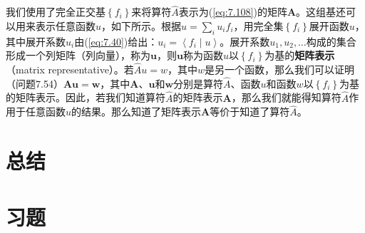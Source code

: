    我们使用了完全正交基$\left\{f_i\right\}$来将算符$\hat{A}$表示为(\ref{eq:7.108})的矩阵$\mathbf{A}$。这组基还可以用来表示任意函数$u$，如下所示。根据$u = \sum_{i}u_{i}f_i$，用完全集$\left\{f_i\right\}$展开函数$u$，其中展开系数$u_i$由(\ref{eq:7.40})给出：$u_i = \left\langle f_i \middle| u \right\rangle$。展开系数$u_1,u_2,\ldots$构成的集合形成一个列矩阵（列向量），称为$\mathbf{u}$，则$\mathbf{u}$称为函数$u$以$\left\{f_i\right\}$为基的\textbf{矩阵表示}（matrix representative）。若$\hat{A}u =w$，其中$w$是另一个函数，那么我们可以证明（问题7.54）$\mathbf{Au} = \mathbf{w}$，其中$\mathbf{A}$、$\mathbf{u}$和$\mathbf{w}$分别是算符$\hat{A}$、函数$u$和函数$w$以$\left\{f_i\right\}$为基的矩阵表示。因此，若我们知道算符$\hat{A}$的矩阵表示$\mathbf{A}$，那么我们就能得知算符$\hat{A}$作用于任意函数$u$的结果。那么知道了矩阵表示$\mathbf{A}$等价于知道了算符$\hat{A}$。
    
\section*{总结}

\section*{习题}